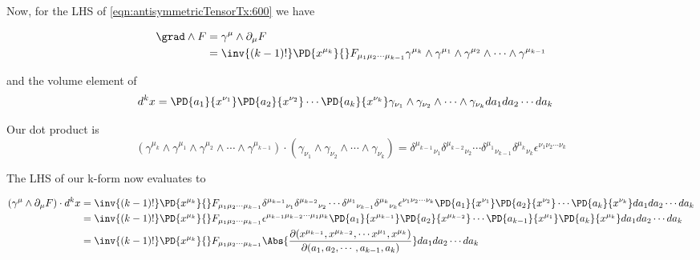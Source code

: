 Now, for the LHS of \ref{eqn:antisymmetricTensorTx:600} we have

\begin{align*}
\grad \wedge F 
&=
\gamma^\mu \wedge \partial_\mu F \\
&=
\inv{(k-1)!}\PD{x^{\mu_k}}{} F_{\mu_1 \mu_2 \cdots \mu_{k-1}}
\gamma^{\mu_k} \wedge
\gamma^{\mu_1} \wedge \gamma^{ \mu_2 } \wedge \cdots \wedge \gamma^{\mu_{k-1}} 
\end{align*}

and the volume element of
\begin{align*}
d^k x 
&=
\PD{a_1}{x^{\nu_1}}
\PD{a_2}{x^{\nu_2}}
\cdots
\PD{a_k}{x^{\nu_{k}}}
\gamma_{\nu_1} \wedge \gamma_{ \nu_2 } \wedge \cdots \wedge \gamma_{\nu_k}
da_1 da_2 \cdots da_k
\end{align*}

Our dot product is
\begin{equation}\label{eqn:antisymmetricTensorTx:630}
\left(\gamma^{\mu_k} \wedge
\gamma^{\mu_1} \wedge \gamma^{ \mu_2 } \wedge \cdots \wedge \gamma^{\mu_{k-1}} \right) \cdot
\left( \gamma_{\nu_1} \wedge \gamma_{ \nu_2 } \wedge \cdots \wedge \gamma_{\nu_k} \right)
=
{\delta^{\mu_{k-1}}}_{\nu_1}  {\delta^{ \mu_{k-2} }}_{\nu_2}  \cdots  
{\delta^{\mu_{1}} }_{\nu_{k-1}}
{\delta^{\mu_{k}} }_{\nu_{k}}
\epsilon^{\nu_1 \nu_2 \cdots \nu_{k}}
\end{equation}

The LHS of our k-form now evaluates to

\begin{align*}
(\gamma^\mu \wedge \partial_\mu F) \cdot d^k x 
&=
\inv{(k-1)!}\PD{x^{\mu_k}}{} F_{\mu_1 \mu_2 \cdots \mu_{k-1}}
{\delta^{\mu_{k-1}}}_{\nu_1}  {\delta^{ \mu_{k-2} }}_{\nu_2}  \cdots  
{\delta^{\mu_{1}} }_{\nu_{k-1}}
{\delta^{\mu_{k}} }_{\nu_{k}}
\epsilon^{\nu_1 \nu_2 \cdots \nu_{k}}
\PD{a_1}{x^{\nu_1}}
\PD{a_2}{x^{\nu_2}}
\cdots
\PD{a_k}{x^{\nu_{k}}}
da_1 da_2 \cdots da_k \\
&=
\inv{(k-1)!}\PD{x^{\mu_k}}{} F_{\mu_1 \mu_2 \cdots \mu_{k-1}}
\epsilon^{\mu_{k-1} \mu_{k-2} \cdots \mu_1 \mu_{k}}
\PD{a_1}{x^{\mu_{k-1}}}
\PD{a_2}{x^{\mu_{k-2}}}
\cdots
\PD{a_{k-1}}{x^{\mu_{1}}}
\PD{a_k}{x^{\mu_{k}}}
da_1 da_2 \cdots da_k \\
&=
\inv{(k-1)!}\PD{x^{\mu_k}}{} F_{\mu_1 \mu_2 \cdots \mu_{k-1}}
\Abs{\frac{\partial(
x^{\mu_{k-1}},
x^{\mu_{k-2}},
\cdots
x^{\mu_{1}},
x^{\mu_{k}}
)}{\partial(a_1, a_2, \cdots, a_{k-1}, a_k)}
}
da_1 da_2 \cdots da_k \\
\end{align*}

